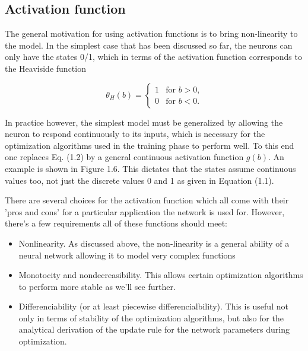 \subsection{Activation function}

The general motivation for using activation functions is to bring non-linearity to the model. In the simplest case that has been discussed so far, the neurons can only have the states 0/1, which in terms of the activation function corresponds to the Heaviside function

$$ 
\theta_H(b) = 
\begin{cases}	
1 & \text{for $b > 0$,}\\
0 & \text{for $b < 0$.}
\end{cases} 
$$

In practice however, the simplest model must be generalized by allowing the neuron to respond continuously to its inputs, which is necessary for the optimization algorithms used in the training phase to perform well. To this end one replaces Eq. (1.2) by a general continuous activation function $ g(b) $. An example is shown in Figure 1.6. This dictates that the states assume continuous values too, not just the discrete values 0 and 1 as given in Equation (1.1).

There are several choices for the activation function which all come with their 'pros and cons' for a particular application the network is used for. However, there's a few requirements all of these functions should meet:

\begin{itemize}
	
\item Nonlinearity. As discussed above, the non-linearity is a general ability of a neural network allowing it to model very complex functions
\item Monotocity and nondecreasibility. This allows certain optimization algorithms to perform more stable as we'll see further.
\item Differenciability (or at least piecewise differencialbility). This is useful not only in terms of stability of the optimization algorithms, but also for the analytical derivation of the update rule for the network parameters during optimization. 
		
\end{itemize}

